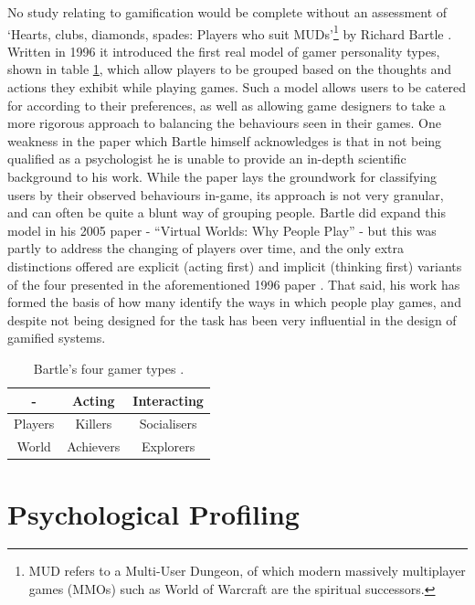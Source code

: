 \documentclass[12pt,a4paper,twoside]{report}
\begin{document}
No study relating to gamification would be complete without an assessment of `Hearts, clubs, diamonds, spades: Players who suit MUDs'\footnote{MUD refers to a Multi-User Dungeon, of which modern massively multiplayer games (MMOs) such as World of Warcraft are the spiritual successors.} by Richard Bartle \cite{bartle1996hearts}. Written in 1996 it introduced the first real model of gamer personality types, shown in table \ref{table:cards}, which allow players to be grouped based on the thoughts and actions they exhibit while playing games. Such a model allows users to be catered for according to their preferences, as well as allowing game designers to take a more rigorous approach to balancing the behaviours seen in their games.  One weakness in the paper which Bartle himself acknowledges is that in not being qualified as a psychologist he is unable to provide an in-depth scientific background to his work. While the paper lays the groundwork for classifying users by their observed behaviours in-game, its approach is not very granular, and can often be quite a blunt way of grouping people. Bartle did expand this model in his 2005 paper - ``Virtual Worlds: Why People Play'' \cite{bartle2005play} - but this was partly to address the changing of players over time, and the only extra distinctions offered are explicit (acting first) and implicit (thinking first) variants of the four presented in the aforementioned 1996 paper \cite{bartle2005play}. That said, his work has formed the basis of how many identify the ways in which people play games, and despite not being designed for the task has been very influential in the design of gamified systems.

\begin{table}
\begin{center}
\begin{tabular}{|c|c|c|}
	\hline - & Acting & Interacting \\ 
	\hline Players & Killers & Socialisers \\ 
	\hline World & Achievers & Explorers \\ 
	\hline 
\end{tabular}
\end{center}
\caption{Bartle's four gamer types \cite{bartle1996hearts}.}
\label{table:cards}
\end{table}

\section{Psychological Profiling}
\end{document}
